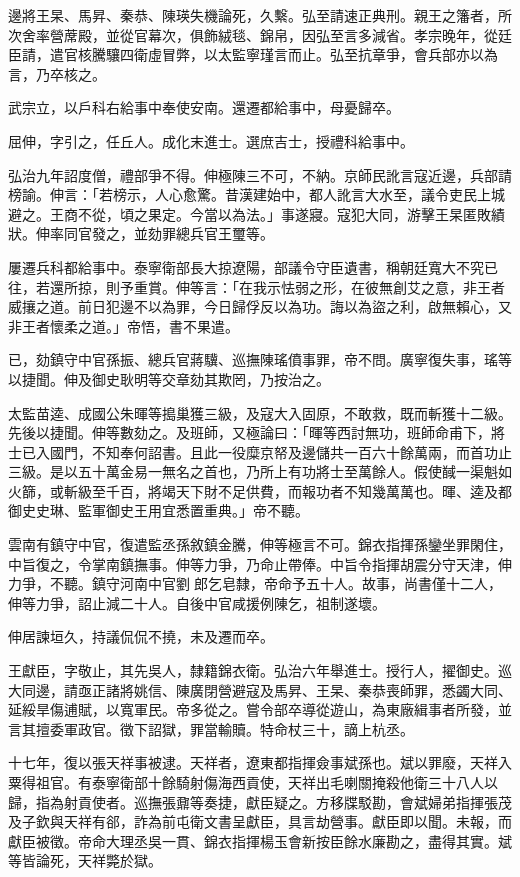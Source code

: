 \begin{pinyinscope}
邊將王杲、馬昇、秦恭、陳瑛失機論死，久繫。弘至請速正典刑。親王之籓者，所次舍率營蓆殿，並從官幕次，俱飾絨毯、錦帛，因弘至言多減省。孝宗晚年，從廷臣請，遣官核騰驤四衛虛冒弊，以太監寧瑾言而止。弘至抗章爭，會兵部亦以為言，乃卒核之。

武宗立，以戶科右給事中奉使安南。還遷都給事中，母憂歸卒。

屈伸，字引之，任丘人。成化末進士。選庶吉士，授禮科給事中。

弘治九年詔度僧，禮部爭不得。伸極陳三不可，不納。京師民訛言寇近邊，兵部請榜諭。伸言：「若榜示，人心愈驚。昔漢建始中，都人訛言大水至，議令吏民上城避之。王商不從，頃之果定。今當以為法。」事遂寢。寇犯大同，游擊王杲匿敗績狀。伸率同官發之，並劾罪總兵官王璽等。

屢遷兵科都給事中。泰寧衛部長大掠遼陽，部議令守臣遺書，稱朝廷寬大不究已往，若還所掠，則予重賞。伸等言：「在我示怯弱之形，在彼無創艾之意，非王者威攘之道。前日犯邊不以為罪，今日歸俘反以為功。誨以為盜之利，啟無賴心，又非王者懷柔之道。」帝悟，書不果遣。

已，劾鎮守中官孫振、總兵官蔣驥、巡撫陳瑤僨事罪，帝不問。廣寧復失事，瑤等以捷聞。伸及御史耿明等交章劾其欺罔，乃按治之。

太監苗逵、成國公朱暉等搗巢獲三級，及寇大入固原，不敢救，既而斬獲十二級。先後以捷聞。伸等數劾之。及班師，又極論曰：「暉等西討無功，班師命甫下，將士已入國門，不知奉何詔書。且此一役糜京帑及邊儲共一百六十餘萬兩，而首功止三級。是以五十萬金易一無名之首也，乃所上有功將士至萬餘人。假使馘一渠魁如火篩，或斬級至千百，將竭天下財不足供費，而報功者不知幾萬萬也。暉、逵及都御史史琳、監軍御史王用宜悉置重典。」帝不聽。

雲南有鎮守中官，復遣監丞孫敘鎮金騰，伸等極言不可。錦衣指揮孫鑾坐罪閑住，中旨復之，令掌南鎮撫事。伸等力爭，乃命止帶俸。中旨令指揮胡震分守天津，伸力爭，不聽。鎮守河南中官劉郎乞皂隸，帝命予五十人。故事，尚書僅十二人，伸等力爭，詔止減二十人。自後中官咸援例陳乞，祖制遂壞。

伸居諫垣久，持議侃侃不撓，未及遷而卒。

王獻臣，字敬止，其先吳人，隸籍錦衣衛。弘治六年舉進士。授行人，擢御史。巡大同邊，請亟正諸將姚信、陳廣閉營避寇及馬昇、王杲、秦恭喪師罪，悉蠲大同、延綏旱傷逋賦，以寬軍民。帝多從之。嘗令部卒導從遊山，為東廠緝事者所發，並言其擅委軍政官。徵下詔獄，罪當輸贖。特命杖三十，謫上杭丞。

十七年，復以張天祥事被逮。天祥者，遼東都指揮僉事斌孫也。斌以罪廢，天祥入粟得祖官。有泰寧衛部十餘騎射傷海西貢使，天祥出毛喇關掩殺他衛三十八人以歸，指為射貢使者。巡撫張鼐等奏捷，獻臣疑之。方移牒駁勘，會斌婦弟指揮張茂及子欽與天祥有郤，詐為前屯衛文書呈獻臣，具言劫營事。獻臣即以聞。未報，而獻臣被徵。帝命大理丞吳一貫、錦衣指揮楊玉會新按臣餘水廉勘之，盡得其實。斌等皆論死，天祥斃於獄。


\end{pinyinscope}
